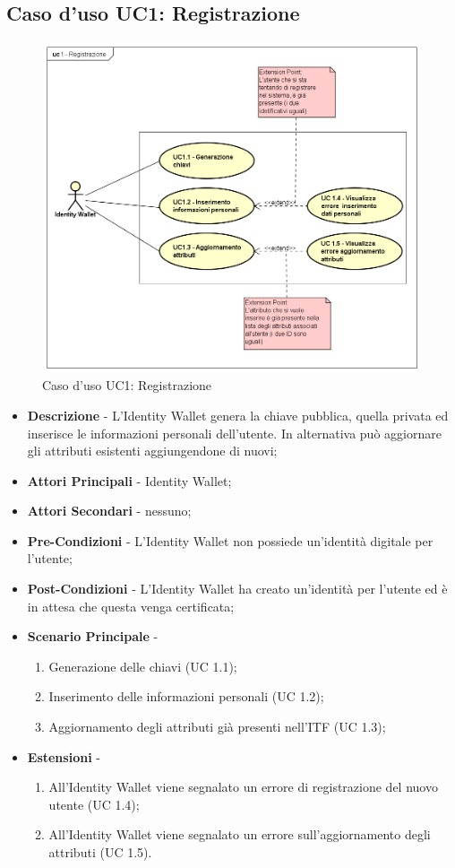 \subsection{Caso d'uso UC1: Registrazione}
\begin{figure}[!h]
	\centering
	\includegraphics[scale=0.35]{immagini/usecase/UC1_Registrazione}
	\caption{Caso d'uso UC1: Registrazione}
\end{figure}
\begin{itemize}
	\item \textbf{Descrizione} - L'Identity Wallet genera la chiave pubblica, quella privata ed inserisce le informazioni personali dell'utente. In alternativa può aggiornare gli attributi esistenti aggiungendone di nuovi;
	\item \textbf{Attori Principali} - Identity Wallet;
	\item \textbf{Attori Secondari} - nessuno;
	\item \textbf{Pre-Condizioni} - L'Identity Wallet non possiede un'identità digitale per l'utente;
	\item \textbf{Post-Condizioni} - L'Identity Wallet ha creato un'identità per l'utente ed è in attesa che questa venga certificata;
	\item \textbf{Scenario Principale} - 
	\begin{enumerate}
		\item Generazione delle chiavi (UC 1.1);
		\item Inserimento delle informazioni personali (UC 1.2);
		\item Aggiornamento degli attributi già presenti nell'\gls{ITF} (UC 1.3);
	\end{enumerate}
	\item \textbf{Estensioni} -
	\begin{enumerate}
		\item All'Identity Wallet viene segnalato un errore di registrazione del nuovo utente (UC 1.4);
		\item All'Identity Wallet viene segnalato un errore sull'aggiornamento degli attributi (UC 1.5).
	\end{enumerate}
\end{itemize}
\newpage
